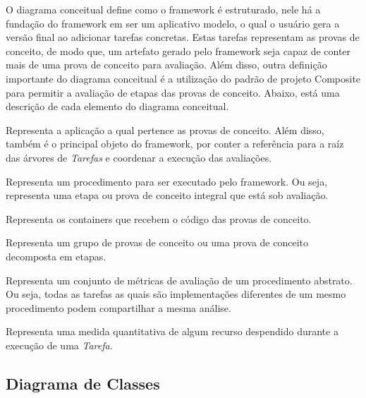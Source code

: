 \documentclass[12pt]{tcc}
\begin{document}
O diagrama conceitual define como o framework é estruturado, nele há a fundação do framework em ser um aplicativo modelo, o qual o usuário gera a versão final ao adicionar tarefas concretas.
Estas tarefas representam as provas de conceito, de modo que, um artefato gerado pelo framework seja capaz de conter mais de uma prova de conceito para avaliação.
Além disso, outra definição importante do diagrama conceitual é a utilização do padrão de projeto Composite \citep{Gamma1995Design} para permitir a avaliação de etapas das provas de conceito.
Abaixo, está uma descrição de cada elemento do diagrama conceitual.

\begin{description}
	\label{descrip:diagrama-conceitual}

	\item[Projeto:] Representa a aplicação a qual pertence as provas de conceito. Além disso, também é o principal objeto do framework, por conter a referência para a raíz das árvores de \textit{Tarefas} e coordenar a execução das avaliações.
	
	\item[Tarefa Abstrata:] Representa um procedimento para ser executado pelo framework. Ou seja, representa uma etapa ou prova de conceito integral que está sob avaliação.

	\item[Tarefa Simples:] Representa os containers que recebem o código das provas de conceito.

	\item[Tarefa Composta:] Representa um grupo de provas de conceito ou uma prova de conceito decomposta em etapas.

	\item[Análise:] Representa um conjunto de métricas de avaliação de um procedimento abstrato. Ou seja, todas as tarefas as quais são implementações diferentes de um mesmo procedimento podem compartilhar a mesma análise.

	\item[Métrica:] Representa uma medida quantitativa de algum recurso despendido durante a execução de uma \textit{Tarefa}.

\end{description}


\subsection{Diagrama de Classes}
\end{document}
